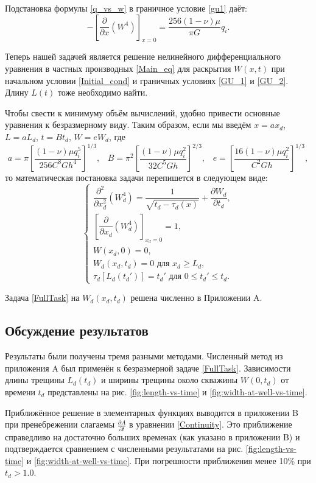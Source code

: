 \documentclass[a4paper, 12pt]{article}
\newcommand{\beq}{\begin{equation}}
\newcommand{\eeq}{\end{equation}}
\begin{document}
Подстановка формулы \eqref{q_vs_w} в граничное условие \eqref{gu1} даёт:
\beq\label{GU_2}
-\left[\frac{\partial}{\partial x}(W^4)\right]_{x=0}=\frac{256(1-\nu)\mu}{\pi G}q_i.
\eeq

Теперь нашей задачей является решение нелинейного дифференциального уравнения в частных производных \eqref{Main_eq} для раскрытия $W(x,t)$ при начальном условии \eqref{Initial_cond} и граничных условиях \eqref{GU_1} и \eqref{GU_2}.
Длину $L(t)$ тоже необходимо найти.

Чтобы свести к минимуму объём вычислений, удобно привести основные уравнения к безразмерному виду.
Таким образом, если мы введём $x=ax_{d}$, $L=aL_{d}$, $t=Bt_{d}$, $W=eW_d$, где
\beq\label{Dimensionless}
a=\pi\left[\frac{(1-\nu)\mu q_i^5}{256C^8Gh^4}\right]^{1/3},\,\,\,\,\,B=\pi^2\left[\frac{(1-\nu)\mu q_i^2}{32C^5Gh}\right]^{2/3},\,\,\,\,\,e=\left[\frac{16(1-\nu)\mu q_i^2}{C^2Gh}\right]^{1/3},
\eeq
то математическая постановка задачи перепишется в следующем виде:
\beq\label{FullTask}
\begin{cases}
\dfrac{\partial^2}{\partial x_d^2}(W_d^4)=\dfrac{1}{\sqrt{t_d-\tau_d(x)}}+\dfrac{\partial W_d}{\partial t_d},\\[15pt]
\left[\dfrac{\partial}{\partial x_d}(W_d^4)\right]_{x_d=0}=1,\\[15pt]
W(x_d,0)=0,\\[5pt]
W_d(x_d,t_d)=0\text{ для } x_d\geqslant L_d,\\[5pt]
\tau_d[L_d(t_d')]=t_d'\text{ для }0\leqslant t_d'\leqslant t_d.
\end{cases}
\eeq

Задача \eqref{FullTask} на $W_d(x_d,t_d)$ решена численно в Приложении A.


\subsection{Обсуждение результатов}

Результаты были получены тремя разными методами.
Численный метод из приложения A был применён к безразмерной задаче \eqref{FullTask}.
Зависимости длины трещины $L_d(t_d)$ и ширины трещины около скважины $W(0,t_d)$ от времени $t_d$ представлены на рис. \ref{fig:length-vs-time} и \ref{fig:width-at-well-vs-time}.

Приближённое решение в элементарных функциях выводится в приложении B при пренебрежении слагаемы $\frac{\partial A}{\partial t}$ в уравнении \eqref{Continuity}.
Это приближение справедливо на достаточно больших временах (как указано в приложении B) и подтверждается сравнением с численными результатами на рис. \ref{fig:length-vs-time} и \ref{fig:width-at-well-vs-time}.
При погрешности приближения менее 10\% при $t_d>1.0$.
\end{document}
